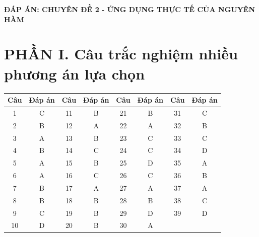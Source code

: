 \documentclass[12pt]{article}
\begin{document}
\begin{center}
	\LARGE \textbf{ĐÁP ÁN: CHUYÊN ĐỀ 2 - ỨNG DỤNG THỰC TẾ CỦA NGUYÊN HÀM}
\end{center}

\vspace{0.5cm}

\section*{PHẦN I. Câu trắc nghiệm nhiều phương án lựa chọn}
\begin{center}
	\begin{tabular}{|c|c|c|c|c|c|c|c|}
		\hline
		\textbf{Câu} & \textbf{Đáp án} & \textbf{Câu} & \textbf{Đáp án} & \textbf{Câu} & \textbf{Đáp án} & \textbf{Câu} & \textbf{Đáp án} \\
		\hline
		1 & C & 11 & B & 21 & B & 31 & C \\
		\hline
		2 & B & 12 & A & 22 & A & 32 & B \\
		\hline
		3 & A & 13 & B & 23 & C & 33 & C \\
		\hline
		4 & B & 14 & C & 24 & C & 34 & D \\
		\hline
		5 & A & 15 & B & 25 & D & 35 & A \\
		\hline
		6 & A & 16 & C & 26 & C & 36 & B \\
		\hline
		7 & B & 17 & A & 27 & A & 37 & A \\
		\hline
		8 & B & 18 & B & 28 & B & 38 & C \\
		\hline
		9 & C & 19 & B & 29 & D & 39 & D \\
		\hline
		10 & D & 20 & B & 30 & A & & \\
		\hline
	\end{tabular}
\end{center}
\end{document}
